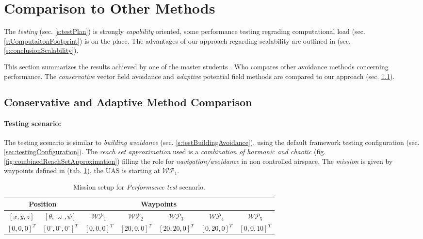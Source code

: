 \section{Comparison to Other Methods}\label{s:OtherMethodsComparison}
\noindent The \emph{testing} (sec. \ref{s:testPlan}) is strongly \emph{capability} oriented, some performance testing regrading computational load (sec. \ref{s:ComputaitonFootprint}) is on the place. The advantages of our approach regarding scalability are outlined in (sec. \ref{s:conclusionScalability}).

This section summarizes the results achieved by one of the master students \cite{hrdlik2018}. Who compares other avoidance methods concerning performance. The  \emph{conservative }vector field avoidance \cite{borenstein1991vector} and \emph{adaptive} potential field \cite{koren1991potential} methods are compared to our approach (sec. \ref{s:conservativeComparison}).

\subsection{Conservative and Adaptive Method Comparison}\label{s:conservativeComparison}
\paragraph{Testing scenario:} The testing scenario is similar to \emph{building avoidance} (sec. \ref{s:testBuildingAvoidance}), using the default framework testing configuration (sec. \ref{sec:testingConfiguration}). The \emph{reach set approximation} used is a \emph{combination of harmonic and chaotic} (fig. \ref{fig:combinedReachSetApproximation}) filling the role for \emph{navigation/avoidance} in non controlled airspace. The \emph{mission} is given by waypoints defined in (tab. \ref{tab:missionSetupForPErformanceTest}), the UAS is starting at $\mathscr{WP}_1$.

\begin{table}[H]
	\centering
	\begin{tabular}{c|c||c|c|c|c|c}
		\multicolumn{2}{c||}{Position} & \multicolumn{4}{c}{Waypoints} \\\hline
		$[x,y,z]$     & $[\theta,\varpi,\psi]$           & $\mathscr{WP}_1$   & $\mathscr{WP}_2$   & $\mathscr{WP}_3$   & $\mathscr{WP}_4$    & $\mathscr{WP}_5$\\\hline\hline
		$[0,0,0]^T $       & $[0^\circ,0^\circ,0^\circ]^T$ & $[0,0,0]^T$ & $[20,0,0]^T$       & $[20,20,0]^T$       & $[0,20,0]^T$       & $[0,0,10]^T$       
	\end{tabular}
	\caption{Mission setup for \emph{Performance test} scenario.}
	\label{tab:missionSetupForPErformanceTest}
\end{table}

